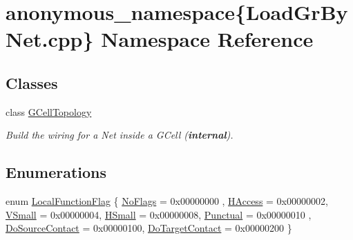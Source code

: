 \hypertarget{namespaceanonymous__namespace_02LoadGrByNet_8cpp_03}{}\section{anonymous\+\_\+namespace\{Load\+Gr\+By\+Net.\+cpp\} Namespace Reference}
\label{namespaceanonymous__namespace_02LoadGrByNet_8cpp_03}
\subsection*{Classes}
\begin{DoxyCompactItemize}
\item 
class \hyperlink{classanonymous__namespace_02LoadGrByNet_8cpp_03_1_1GCellTopology}{G\+Cell\+Topology}
\begin{DoxyCompactList}\small\item\em Build the wiring for a Net inside a G\+Cell ({\bfseries internal}). \end{DoxyCompactList}\end{DoxyCompactItemize}
\subsection*{Enumerations}
\begin{DoxyCompactItemize}
\item 
enum \hyperlink{group__LoadGlobalRouting_gaec07c7f30c801c3b0f72193757250d64}{Local\+Function\+Flag} \{ \newline
\hyperlink{group__LoadGlobalRouting_ggaec07c7f30c801c3b0f72193757250d64add44bf8d6f7bbe1393d76b940b85294b}{No\+Flags} = 0x00000000
, \newline
\hyperlink{group__LoadGlobalRouting_ggaec07c7f30c801c3b0f72193757250d64a5c3692a6c886c6293a3c9f240b60a5d9}{H\+Access} = 0x00000002, 
\newline
\hyperlink{group__LoadGlobalRouting_ggaec07c7f30c801c3b0f72193757250d64a260f6bf57246879aed7febfe83c9dacc}{V\+Small} = 0x00000004, 
\newline
\hyperlink{group__LoadGlobalRouting_ggaec07c7f30c801c3b0f72193757250d64af1a4f1cb841460f20d26dcf902247fb8}{H\+Small} = 0x00000008, 
\newline
\hyperlink{group__LoadGlobalRouting_ggaec07c7f30c801c3b0f72193757250d64a65b52a199afe857e3d551dbac8b293b9}{Punctual} = 0x00000010
, \newline
\hyperlink{group__LoadGlobalRouting_ggaec07c7f30c801c3b0f72193757250d64aece46caaf822b33d7db94bb2dd16a30d}{Do\+Source\+Contact} = 0x00000100, 
\newline
\hyperlink{group__LoadGlobalRouting_ggaec07c7f30c801c3b0f72193757250d64aeb33c01c5e62df73de6b11888b17a5f2}{Do\+Target\+Contact} = 0x00000200
 \}
\end{DoxyCompactItemize}
